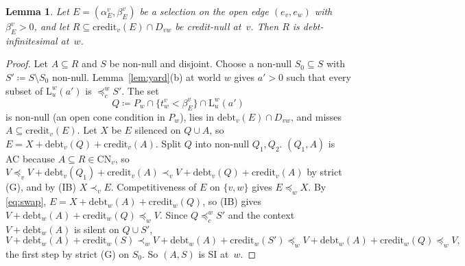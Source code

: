 \documentclass[11pt]{article}
\newtheorem{lemma}[theorem]{Lemma}
\theoremstyle{definition}\newtheorem{definition}[theorem]{Definition}
\theoremstyle{remark}\newtheorem{remark}[theorem]{Remark}
\newcommand{\debt}{\mathrm{debt}}
\newcommand{\cred}{\mathrm{credit}}
\newcommand{\Lo}[3]{\mathrm L^{#1}_{#2}(#3)}
\newcommand{\CN}{\mathrm{CN}}
\begin{document}
\begin{lemma}\label{lem:CNtoDI}
Let $E=(\alpha^v_E,\beta^v_E)$ be a selection on the open edge $(e_v,e_w)$
with $\beta^v_E>0$, and let $R\subseteq\cred_v(E)\cap D_{vw}$ be credit-null
at~$v$. Then $R$ is debt-infinitesimal at~$w$.
\end{lemma}
\begin{proof}
Let $A\subseteq R$ and $S$ be non-null and disjoint. Choose a non-null
$S_0\subseteq S$ with $S'\coloneqq S\setminus S_0$ non-null.
Lemma~\ref{lem:yard}(b) at world $w$ gives $a'>0$ such that every subset
of $\Lo wu{a'}$ is $\preceq^w_cS'$. The set
\[
 Q\coloneqq P_w\cap\{t^v_w<\beta^v_E\}\cap\Lo wu{a'}
\]
is non-null (an open cone condition in $P_w$), lies in $\debt_v(E)\cap
D_{vw}$, and misses $A\subseteq\cred_v(E)$. Let $X$ be $E$ silenced on
$Q\cup A$, so $E=X+\debt_v(Q)+\cred_v(A)$. Split $Q$ into non-null $Q_1,Q_2$.
$(Q_1,A)$ is AC because $A\subseteq R\in\CN_v$, so
$V\preceq_vV+\debt_v(Q_1)+\cred_v(A)\prec_vV+\debt_v(Q)+\cred_v(A)$ by strict
(G), and by (IB) $X\prec_vE$. Competitiveness of $E$ on $\{v,w\}$ gives
$E\preceq_wX$. By \eqref{eq:swap}, $E=X+\debt_w(A)+\cred_w(Q)$, so (IB) gives
$V+\debt_w(A)+\cred_w(Q)\preceq_wV$. Since $Q\preceq^w_cS'$ and the context
$V+\debt_w(A)$ is silent on $Q\cup S'$,
\[
 V+\debt_w(A)+\cred_w(S)\prec_wV+\debt_w(A)+\cred_w(S')\preceq_w
 V+\debt_w(A)+\cred_w(Q)\preceq_wV,
\]
the first step by strict (G) on $S_0$. So $(A,S)$ is SI at~$w$.
\end{proof}
\end{document}

